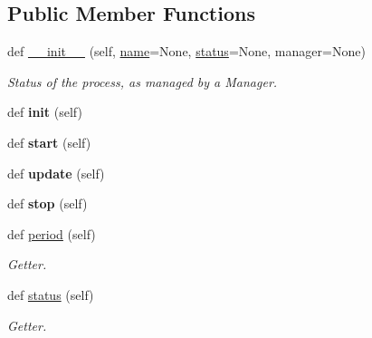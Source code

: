 \subsection*{Public Member Functions}
\begin{DoxyCompactItemize}
\item 
def \hyperlink{classelma_1_1api_1_1process_1_1Process_a7a539964a64e16cc8bc42e15124df35e}{\+\_\+\+\_\+init\+\_\+\+\_\+} (self, \hyperlink{classelma_1_1api_1_1process_1_1Process_affa061fab12e699d4d04471bfaf52a1a}{name}=None, \hyperlink{classelma_1_1api_1_1process_1_1Process_a6dc2725cd3d032b3ec80e0fc6c52a994}{status}=None, manager=None)
\begin{DoxyCompactList}\small\item\em Status of the process, as managed by a Manager. \end{DoxyCompactList}\item 
\mbox{\label{classelma_1_1api_1_1process_1_1Process_a04c3be5718b17eac25b42779ea368793}} 
def {\bfseries init} (self)
\item 
\mbox{\label{classelma_1_1api_1_1process_1_1Process_a61245c078eec81fa9ce79105942e7cb3}} 
def {\bfseries start} (self)
\item 
\mbox{\label{classelma_1_1api_1_1process_1_1Process_ab95818df6159186c9d286963ad561da1}} 
def {\bfseries update} (self)
\item 
\mbox{\label{classelma_1_1api_1_1process_1_1Process_a2751375eb541bb0dae8211d4b692b4fc}} 
def {\bfseries stop} (self)
\item 
def \hyperlink{classelma_1_1api_1_1process_1_1Process_a8e37ba949b3285fe52ca8638cdcb0bb9}{period} (self)
\begin{DoxyCompactList}\small\item\em Getter. \end{DoxyCompactList}\item 
def \hyperlink{classelma_1_1api_1_1process_1_1Process_a6dc2725cd3d032b3ec80e0fc6c52a994}{status} (self)
\begin{DoxyCompactList}\small\item\em Getter. \end{DoxyCompactList}\item 

\end{DoxyCompactItemize}

